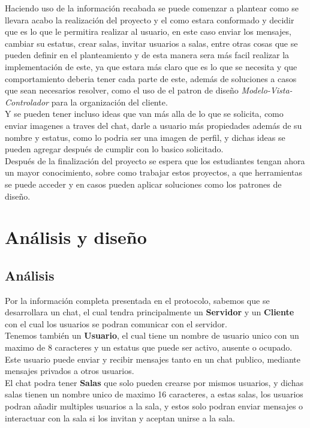 \documentclass[12pt]{report}
\begin{document}
Haciendo uso de la información recabada se puede comenzar a plantear como se llevara acabo la realización del proyecto y el como estara conformado y decidir que es lo que le permitira realizar al usuario, en este caso enviar los mensajes, cambiar su estatus, crear salas, invitar usuarios a salas, entre otras cosas que se pueden definir en el planteamiento y de esta manera sera más facil realizar la implementación de este, ya que estara más claro que es lo que se necesita y que comportamiento deberia tener cada parte de este, además de soluciones a casos que sean necesarios resolver, como el uso de el patron de diseño \textit{Modelo-Vista-Controlador} para la organización del cliente.\\

Y se pueden tener incluso ideas que van más alla de lo que se solicita, como enviar imagenes a traves del chat, darle a usuario más propiedades además de su nombre y estatus, como lo podria ser una imagen de perfil, y dichas ideas se pueden agregar después de cumplir con lo basico solicitado.\\

Después de la finalización del proyecto se espera que los estudiantes tengan ahora un mayor conocimiento, sobre como trabajar estos proyectos, a que herramientas se puede acceder y en casos pueden aplicar soluciones como los patrones de diseño.\\

\chapter{Análisis y diseño}
\section{Análisis}
Por la información completa presentada en el protocolo, sabemos que se desarrollara un chat, el cual tendra principalmente un \textbf{Servidor} y un \textbf{Cliente} con el cual los usuarios se podran comunicar con el servidor.\\

Tenemos también un \textbf{Usuario}, el cual tiene un nombre de usuario unico con un maximo de 8 caracteres y un estatus que puede ser activo, ausente o ocupado. Este usuario puede enviar y recibir mensajes tanto en un chat publico, mediante mensajes privados a otros usuarios. \\

El chat podra tener \textbf{Salas} que solo pueden crearse por mismos usuarios, y dichas salas tienen un nombre unico de maximo 16 caracteres, a estas salas, los usuarios podran añadir multiples usuarios a la sala, y estos solo podran enviar mensajes o interactuar con la sala si los invitan y aceptan unirse a la sala.\\
\end{document}
